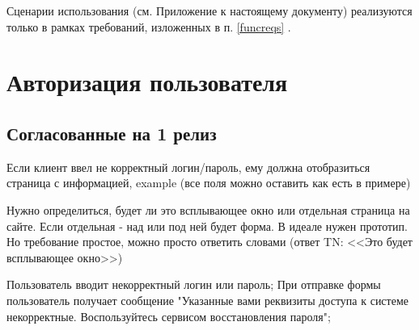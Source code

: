 Сценарии использования (см. Приложение  к настоящему документу) реализуются только в рамках требований, изложенных в п. \ref{funcreqs} .

\section{Авторизация пользователя}
\ifcand
\subsection{Согласованные на 1 релиз}
\fi

{


\begin{wiki}
Если клиент ввел не корректный логин/пароль, ему должна отобразиться страница с информацией, example (все поля можно  оставить как есть в примере)
\end{wiki}

\begin{teamidea}
Нужно определиться, будет ли это всплывающее окно или отдельная страница на сайте. Если отдельная - над или под ней будет форма.  В идеале нужен прототип. Но требование простое, можно просто ответить словами (ответ TN: <<Это будет всплывающее окно>>)
\end{teamidea}




\begin{itogo}
Пользователь вводит некорректный логин или пароль; При отправке формы пользователь получает сообщение "Указанные вами реквизиты доступа к системе некорректные. Воспользуйтесь сервисом восстановления пароля";
\end{itogo}

}

